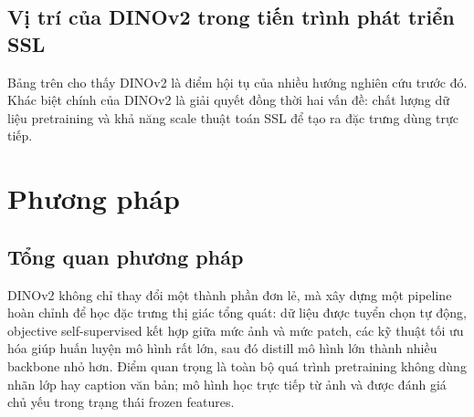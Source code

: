 \subsection{Vị trí của DINOv2 trong tiến trình phát triển SSL}
\begin{table}[h]
\centering
{}
\caption{Tiến trình phát triển SSL và vị trí của DINOv2.}
\label{tab:ssl_progress}
\end{table}

Bảng trên cho thấy DINOv2 là điểm hội tụ của nhiều hướng nghiên cứu trước đó. Khác biệt chính của DINOv2 là giải quyết đồng thời hai vấn đề: chất lượng dữ liệu pretraining và khả năng scale thuật toán SSL để tạo ra đặc trưng dùng trực tiếp.

\section{Phương pháp}
\subsection*{Tổng quan phương pháp}
DINOv2 không chỉ thay đổi một thành phần đơn lẻ, mà xây dựng một pipeline hoàn chỉnh để học đặc trưng thị giác tổng quát: dữ liệu được tuyển chọn tự động, objective self-supervised kết hợp giữa mức ảnh và mức patch, các kỹ thuật tối ưu hóa giúp huấn luyện mô hình rất lớn, sau đó distill mô hình lớn thành nhiều backbone nhỏ hơn. Điểm quan trọng là toàn bộ quá trình pretraining không dùng nhãn lớp hay caption văn bản; mô hình học trực tiếp từ ảnh và được đánh giá chủ yếu trong trạng thái frozen features.

